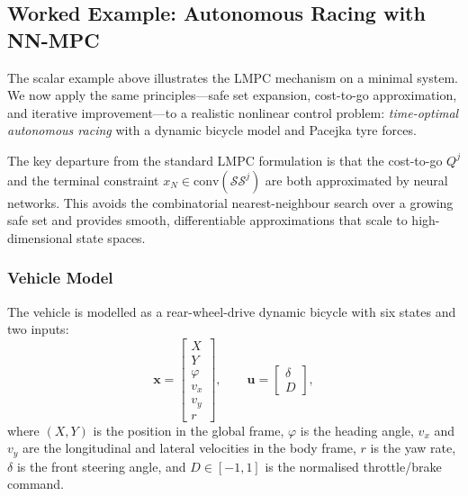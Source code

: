 
\subsection{Worked Example: Autonomous Racing with NN-MPC}
\label{sec:nnmpc_racing}

The scalar example above illustrates the LMPC mechanism on a minimal system. We now apply the same principles---safe set expansion, cost-to-go approximation, and iterative improvement---to a realistic nonlinear control problem: \emph{time-optimal autonomous racing} with a dynamic bicycle model and Pacejka tyre forces.

The key departure from the standard LMPC formulation is that the cost-to-go $Q^j$ and the terminal constraint $x_N \in \text{conv}(\mathcal{SS}^j)$ are both approximated by neural networks. This avoids the combinatorial nearest-neighbour search over a growing safe set and provides smooth, differentiable approximations that scale to high-dimensional state spaces.

\subsubsection{Vehicle Model}

The vehicle is modelled as a rear-wheel-drive dynamic bicycle with six states and two inputs:
\begin{equation*}
	\mathbf{x} = \begin{bmatrix} X \\ Y \\ \varphi \\ v_x \\ v_y \\ r \end{bmatrix}, \qquad
	\mathbf{u} = \begin{bmatrix} \delta \\ D \end{bmatrix},
\end{equation*}
where $(X, Y)$ is the position in the global frame, $\varphi$ is the heading angle, $v_x$ and $v_y$ are the longitudinal and lateral velocities in the body frame, $r$ is the yaw rate, $\delta$ is the front steering angle, and $D \in [-1, 1]$ is the normalised throttle/brake command.

